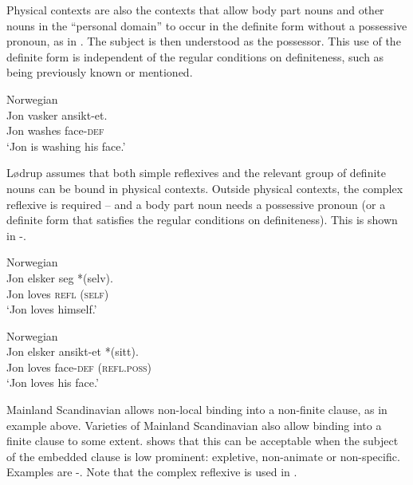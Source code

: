 \documentclass[output=paper,hidelinks]{langscibook}
\begin{document}
 Physical contexts are also the contexts that allow body part nouns and other nouns in the ``personal domain'' to occur in the definite form without a possessive pronoun, as in  \citep{Lodrup99b,Lodrup10}. The subject is then understood as the possessor. This use of the definite form is independent of the regular conditions on definiteness, such as being previously known or mentioned.




\ea\label{ex:Scandinavian:113} Norwegian\\
\gll
 {Jon} {vasker} {ansikt-et}\textsc{.}\\
 Jon washes face-\textsc{def}\\
\glt `Jon is washing his face.'\z


\noindent Lødrup assumes that both simple reflexives and the relevant group of definite nouns can be bound in physical contexts. Outside physical contexts, the complex reflexive is required -- and a body part noun needs a possessive pronoun (or a definite form that satisfies the regular conditions on definiteness). This is shown in -.




\ea\label{ex:Scandinavian:114} Norwegian\\
\gll
 {Jon} {elsker} {seg} {*(selv)}\textsc{.}\\
 Jon loves \textsc{refl} \textsc{(self})\\
\glt `Jon loves himself.'\z



\ea\label{ex:Scandinavian:115} Norwegian\\
\gll
 {Jon} {elsker} {ansikt-et} {*(sitt)}\textsc{.}\\
 Jon loves face-\textsc{def} (\textsc{refl.poss})\\
\glt `Jon loves his face.'\z

 Mainland Scandinavian allows
non-local binding into a non-finite clause, as in example
 above. Varieties of Mainland Scandinavian also allow
binding into a finite clause to some extent. \citet{Lodrup09b} shows that this can be acceptable when the subject of the embedded clause is low prominent: expletive, non-animate or non-specific. Examples are -. Note that the complex reflexive is used in .
\end{document}
